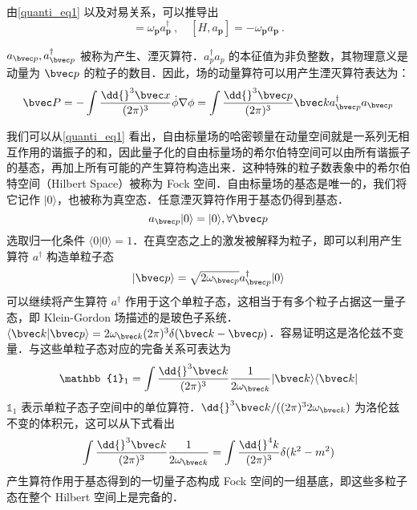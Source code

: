 由\autoref{quanti_eq1} 以及对易关系，可以推导出
\begin{equation}
[H,a_{\mathbf p}^\dagger] = \omega_{\mathbf p} a^\dagger_{\mathbf p}~, \quad [H,a_{\mathbf p}] = -\omega_{\mathbf p} a_{\mathbf p}~.
\end{equation}

$a_{\bvec p},a_{\bvec p}^\dagger$ 被称为产生、湮灭算符．$a_p^\dagger a_p$ 的本征值为非负整数，其物理意义是动量为 $\bvec p$ 的粒子的数目．因此，场的动量算符可以用产生湮灭算符表达为：
\begin{equation}
\bvec P=-\int \frac{\dd{}^3 \bvec x}{(2\pi)^3}\dot\phi\nabla\phi=\int \frac{\dd{}^3 \bvec p}{(2\pi)^3 }\bvec k a_{\bvec p}^\dagger a_{\bvec p}
\end{equation} 

我们可以从\autoref{quanti_eq1} 看出，自由标量场的哈密顿量在动量空间就是一系列无相互作用的谐振子的和，因此量子化的自由标量场的希尔伯特空间可以由所有谐振子的基态，再加上所有可能的产生算符构造出来．这种特殊的粒子数表象中的希尔伯特空间（Hilbert Space）被称为 Fock 空间．自由标量场的基态是唯一的，我们将它记作 $|0\rangle$，也被称为真空态．任意湮灭算符作用于基态仍得到基态．
\begin{equation}
a_{\bvec p} |0\rangle = |0\rangle,\forall \bvec p
\end{equation}
选取归一化条件 $\langle 0|0\rangle=1$．在真空态之上的激发被解释为粒子，即可以利用产生算符 $a^\dagger$ 构造单粒子态
\begin{equation}
|\bvec p\rangle = \sqrt{2\omega_{\bvec p}}a^\dagger_{\bvec p} |0\rangle
\end{equation}
可以继续将产生算符 $a^\dagger$ 作用于这个单粒子态，这相当于有多个粒子占据这一量子态，即 Klein-Gordon 场描述的是玻色子系统．$\langle \bvec k|\bvec p\rangle = 2\omega_{\bvec k}(2\pi)^3\delta(\bvec k-\bvec p)$．容易证明这是洛伦兹不变量．与这些单粒子态对应的完备关系可表达为
\begin{equation}
\mathbb{1}_1 = \int \frac{\dd{}^3 \bvec k}{(2\pi)^{3}}\frac{1}{2\omega_{\bvec k}}|\bvec k\rangle \langle \bvec k|
\end{equation}
$\mathbb{1}_1$ 表示单粒子态子空间中的单位算符．$\dd{}^3 \bvec k/((2\pi)^3 2\omega_{\bvec k})$ 为洛伦兹不变的体积元，这可以从下式看出
\begin{equation}
\int \frac{\dd{}^3\bvec k}{(2\pi)^3}\frac{1}{2\omega_{\bvec k}}=\int \frac{\dd{}^4 k}{(2\pi)^3} \delta(k^2-m^2)
\end{equation}
产生算符作用于基态得到的一切量子态构成 Fock 空间的一组基底，即这些多粒子态在整个 Hilbert 空间上是完备的．

